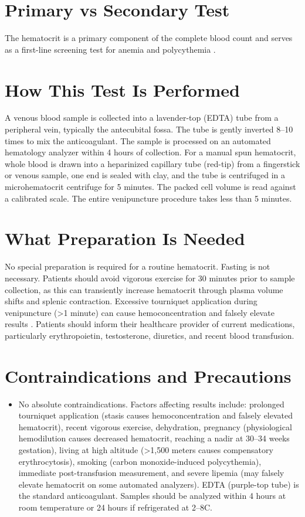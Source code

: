 \section*{Primary vs Secondary Test}
The hematocrit is a primary component of the complete blood count and serves as a first-line screening test for anemia and polycythemia \cite{tierney2023current}.

\section*{How This Test Is Performed}
A venous blood sample is collected into a lavender-top (EDTA) tube from a peripheral vein, typically the antecubital fossa. The tube is gently inverted 8--10 times to mix the anticoagulant. The sample is processed on an automated hematology analyzer within 4 hours of collection. For a manual spun hematocrit, whole blood is drawn into a heparinized capillary tube (red-tip) from a fingerstick or venous sample, one end is sealed with clay, and the tube is centrifuged in a microhematocrit centrifuge for 5 minutes. The packed cell volume is read against a calibrated scale. The entire venipuncture procedure takes less than 5 minutes.

\section*{What Preparation Is Needed}
No special preparation is required for a routine hematocrit. Fasting is not necessary. Patients should avoid vigorous exercise for 30 minutes prior to sample collection, as this can transiently increase hematocrit through plasma volume shifts and splenic contraction. Excessive tourniquet application during venipuncture (>1 minute) can cause hemoconcentration and falsely elevate results \cite{wallach2022interpretation}. Patients should inform their healthcare provider of current medications, particularly erythropoietin, testosterone, diuretics, and recent blood transfusion.

\section*{Contraindications and Precautions}
\begin{itemize}
  \item No absolute contraindications. Factors affecting results include: prolonged tourniquet application (stasis causes hemoconcentration and falsely elevated hematocrit), recent vigorous exercise, dehydration, pregnancy (physiological hemodilution causes decreased hematocrit, reaching a nadir at 30--34 weeks gestation), living at high altitude (>1,500 meters causes compensatory erythrocytosis), smoking (carbon monoxide-induced polycythemia), immediate post-transfusion measurement, and severe lipemia (may falsely elevate hematocrit on some automated analyzers). EDTA (purple-top tube) is the standard anticoagulant. Samples should be analyzed within 4 hours at room temperature or 24 hours if refrigerated at 2--8\textdegree{}C.
\end{itemize}
